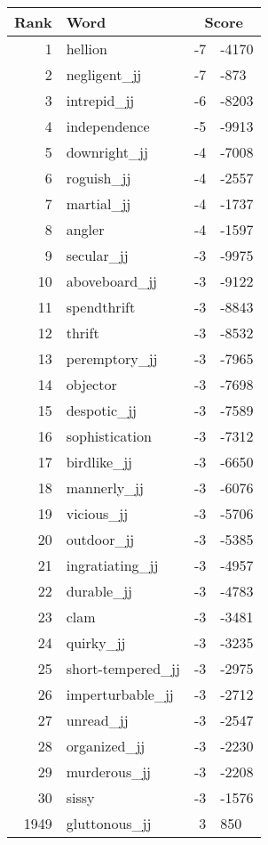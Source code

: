 \begin{longtable}[!htbp]{| rlr@{.}l |}
    \hline
    \textbf{Rank} & \textbf{Word} & \multicolumn{2}{c|}{\textbf{Score}} \\
    \hline
    \endhead
    1 & hellion & -7 & -4170 \\
    2 & negligent\_jj & -7 & -873 \\
    3 & intrepid\_jj & -6 & -8203 \\
    4 & independence & -5 & -9913 \\
    5 & downright\_jj & -4 & -7008 \\
    6 & roguish\_jj & -4 & -2557 \\
    7 & martial\_jj & -4 & -1737 \\
    8 & angler & -4 & -1597 \\
    9 & secular\_jj & -3 & -9975 \\
    10 & aboveboard\_jj & -3 & -9122 \\
    11 & spendthrift & -3 & -8843 \\
    12 & thrift & -3 & -8532 \\
    13 & peremptory\_jj & -3 & -7965 \\
    14 & objector & -3 & -7698 \\
    15 & despotic\_jj & -3 & -7589 \\
    16 & sophistication & -3 & -7312 \\
    17 & birdlike\_jj & -3 & -6650 \\
    18 & mannerly\_jj & -3 & -6076 \\
    19 & vicious\_jj & -3 & -5706 \\
    20 & outdoor\_jj & -3 & -5385 \\
    21 & ingratiating\_jj & -3 & -4957 \\
    22 & durable\_jj & -3 & -4783 \\
    23 & clam & -3 & -3481 \\
    24 & quirky\_jj & -3 & -3235 \\
    25 & short-tempered\_jj & -3 & -2975 \\
    26 & imperturbable\_jj & -3 & -2712 \\
    27 & unread\_jj & -3 & -2547 \\
    28 & organized\_jj & -3 & -2230 \\
    29 & murderous\_jj & -3 & -2208 \\
    30 & sissy & -3 & -1576 \\
    1949 & gluttonous\_jj & 3 & 850 \\

\end{longtable}
